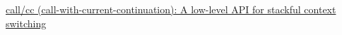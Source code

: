 \newpage
{}
\begin{thebibliography}{99}

        \href{http://www.open-std.org/jtc1/sc22/wg21/docs/papers/2017/p0534r0.pdf}
        {call/cc (call-with-current-continuation): A low-level API for stackful
        context switching}

\end{thebibliography}
